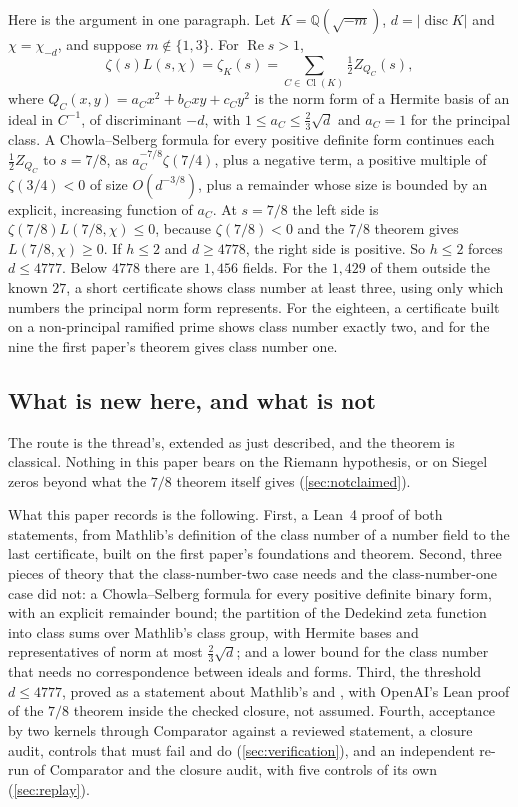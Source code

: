 \documentclass[11pt]{article}
\theoremstyle{definition}
\newcommand{\re}{\operatorname{Re}}
\newcommand{\Q}{\mathbb{Q}}
\newcommand{\disc}{\operatorname{disc}}
\newcommand{\Cl}{\operatorname{Cl}}
\begin{document}
Here is the argument in one paragraph. Let $K = \Q(\sqrt{-m})$, $d = |\disc K|$ and $\chi = \chi_{-d}$, and suppose $m \notin \{1, 3\}$. For $\re s > 1$,
\[
\zeta(s)L(s,\chi) = \zeta_K(s) = \sum_{C \in \Cl(K)} \tfrac12 Z_{Q_C}(s),
\]
where $Q_C(x,y) = a_Cx^2 + b_Cxy + c_Cy^2$ is the norm form of a Hermite basis of an ideal in $C^{-1}$, of discriminant $-d$, with $1 \le a_C \le \frac23\sqrt d$ and $a_C = 1$ for the principal class. A Chowla--Selberg formula for every positive definite form continues each $\frac12 Z_{Q_C}$ to $s = 7/8$, as $a_C^{-7/8}\zeta(7/4)$, plus a negative term, a positive multiple of $\zeta(3/4) < 0$ of size $O(d^{-3/8})$, plus a remainder whose size is bounded by an explicit, increasing function of $a_C$. At $s = 7/8$ the left side is $\zeta(7/8)L(7/8,\chi) \le 0$, because $\zeta(7/8) < 0$ and the $7/8$ theorem gives $L(7/8,\chi) \ge 0$. If $h \le 2$ and $d \ge 4778$, the right side is positive. So $h \le 2$ forces $d \le 4777$. Below $4778$ there are $1{,}456$ fields. For the $1{,}429$ of them outside the known $27$, a short certificate shows class number at least three, using only which numbers the principal norm form represents. For the eighteen, a certificate built on a non-principal ramified prime shows class number exactly two, and for the nine the first paper's theorem gives class number one.

\subsection{What is new here, and what is not}

The route is the thread's, extended as just described, and the theorem is classical. Nothing in this paper bears on the Riemann hypothesis, or on Siegel zeros beyond what the $7/8$ theorem itself gives (\cref{sec:notclaimed}).

What this paper records is the following. First, a Lean~4 proof of both statements, from Mathlib's definition of the class number of a number field to the last certificate, built on the first paper's foundations and theorem. Second, three pieces of theory that the class-number-two case needs and the class-number-one case did not: a Chowla--Selberg formula for every positive definite binary form, with an explicit remainder bound; the partition of the Dedekind zeta function into class sums over Mathlib's class group, with Hermite bases and representatives of norm at most $\frac23\sqrt d$; and a lower bound for the class number that needs no correspondence between ideals and forms. Third, the threshold $d \le 4777$, proved as a statement about Mathlib's  and , with OpenAI's Lean proof of the $7/8$ theorem inside the checked closure, not assumed. Fourth, acceptance by two kernels through Comparator against a reviewed statement, a closure audit, controls that must fail and do (\cref{sec:verification}), and an independent re-run of Comparator and the closure audit, with five controls of its own (\cref{sec:replay}).
\end{document}
